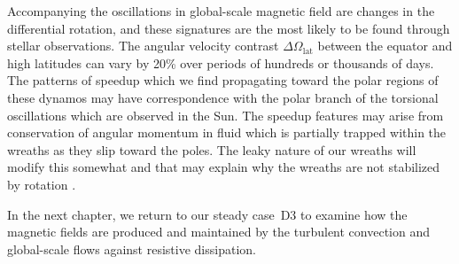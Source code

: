 Accompanying the oscillations in global-scale magnetic field are
changes in the differential rotation, and these signatures are the
most likely to be found through stellar observations.  The angular velocity
contrast $\Delta \Omega_\mathrm{lat}$ between the equator and high
latitudes can vary by 20\% over periods of hundreds or thousands of
days.  The patterns of speedup which we find propagating toward the
polar regions of these dynamos may have correspondence with the polar
branch of the torsional oscillations which are observed in the Sun.
The speedup features may arise from conservation of angular momentum
in fluid which is partially trapped within the wreaths as they slip
toward the poles.  The leaky nature of our wreaths will modify this
somewhat and that may explain why the wreaths are not stabilized by
rotation \citep[e.g.,][]{Moreno-Insertis_et_al_1992}.

In the next chapter, we return to our steady case~D3 to examine how
the magnetic fields are produced and maintained by the turbulent
convection and global-scale flows against resistive dissipation.






















